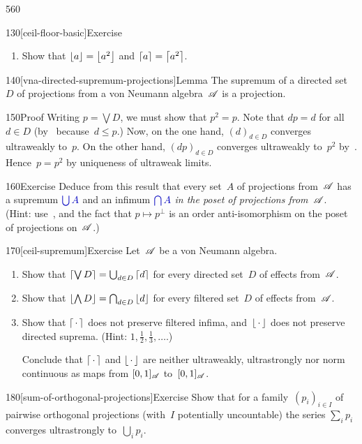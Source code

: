 \begin{parsec}{560}
\begin{point}{130}[ceil-floor-basic]{Exercise}
\begin{enumerate}
Use this to prove that~$\ceil{\lambda a+\lambda^\perp b}$
is the supremum of~$\ceil{a}$ and~$\ceil{b}$
in the poset of projections of~$\scrA$
when~$\lambda\neq 0$ and~$\lambda\neq 1$.
\item
Show that $\left\lfloor a\right\rfloor=\left\lfloor a^2\right\rfloor$
and $\left\lceil a\right\rceil=\left\lceil a^2\right\rceil$.
\end{enumerate}
\end{point}
\begin{point}{140}[vna-directed-supremum-projections]{Lemma}%
The supremum of a directed set~$D$ of projections
from a von Neumann algebra~$\scrA$ is a projection.
\begin{point}{150}{Proof}%
Writing $p=\bigvee D$,
we must show that $p^2=p$.
Note that $dp=d$ for all~$d\in D$
(by~ because~$d\leq p$.)
Now, on the one hand, $(d)_{d\in D}$
converges ultraweakly to~$p$.
On the other hand,
$(dp)_{d\in D}$
converges ultraweakly to~$p^2$ by~.
Hence~$p=p^2$ by uniqueness of ultraweak limits.
\end{point}
\end{point}
\begin{point}{160}{Exercise}%
Deduce from this result
 that every set~$A$ of projections from~$\scrA$
has a supremum $\Define{\bigcup A}$%
and an infimum $\Define{\bigcap A}$%
\emph{in the poset of projections from~$\scrA$}.\\
(Hint: use~,
and the fact that $p\mapsto p^\perp$ 
is an order anti-isomorphism on the poset of projections on~$\scrA$.)
\end{point}
\begin{point}{170}[ceil-supremum]{Exercise}
Let~$\scrA$ be a von Neumann algebra.
\begin{enumerate}
\item
Show that $\left\lceil\bigvee D\right\rceil=\bigcup_{d\in D} \left\lceil d\right\rceil$
for every directed set~$D$ of effects from~$\scrA$.
\item
Show that $\left\lfloor\bigwedge D\right\rfloor = \bigcap_{d\in D} \left\lfloor d\right\rfloor$
for every filtered set~$D$ of effects from~$\scrA$.
\item
Show that $\left\lceil\,\cdot\,\right\rceil$
does not preserve filtered infima,
and~$\left\lfloor\,\cdot\,\right\rfloor$
does not preserve directed suprema.
(Hint: $1,\frac{1}{2},\frac{1}{3},\dotsc$.)

Conclude that $\left\lceil\,\cdot\,\right\rceil$
and $\left\lfloor\,\cdot\,\right\rfloor$
are neither ultraweakly, ultrastrongly nor norm  continuous
as maps from $[0,1]_{\mathscr{A}}$ to~$[0,1]_{\mathscr{A}}$.
\end{enumerate}
\end{point}
\begin{point}{180}[sum-of-orthogonal-projections]{Exercise}%
Show that for a family~$(p_i)_{i\in I}$ 
of pairwise orthogonal projections
(with~$I$ potentially uncountable)
the series $\sum_i p_i$
converges ultrastrongly to~$\bigcup_i p_i$.


\end{point}
\end{parsec}
